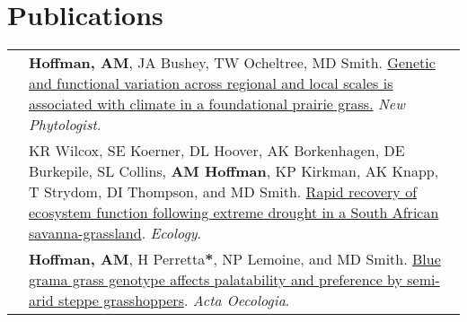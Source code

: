 \documentclass[letterpaper]{deedy-resume} %
\begin{document}

\section{Publications}
\begin{tabular}{>{\raggedleft\arraybackslash}p{2cm}p{16cm}}

2020 & \textbf{Hoffman, AM}, JA Bushey, TW Ocheltree, MD Smith. \href{https://nph.onlinelibrary.wiley.com/doi/abs/10.1111/nph.16547}{Genetic and functional variation across regional and local scales is associated with climate in a foundational prairie grass.} \textcolor{special}{\textit{New Phytologist}}.\\

2020 & KR Wilcox, SE Koerner, DL Hoover, AK Borkenhagen, DE Burkepile, SL Collins, \textbf{AM Hoffman}, KP Kirkman, AK Knapp, T Strydom, DI Thompson, and MD Smith. \href{https://esajournals.onlinelibrary.wiley.com/doi/abs/10.1002/ecy.2983}{Rapid recovery of ecosystem function following extreme drought in a South African savanna-grassland}. \textcolor{special}{\textit{Ecology}}.\\

2019 & \textbf{Hoffman, AM}, H Perretta\textbf{*}, NP Lemoine, and MD Smith. \href{https://doi.org/10.1016/j.actao.2019.03.001}{Blue grama grass genotype affects palatability and preference by semi-arid steppe grasshoppers}. \textcolor{special}{\textit{Acta Oecologia}}.\\

\end{tabular}
\end{document}

